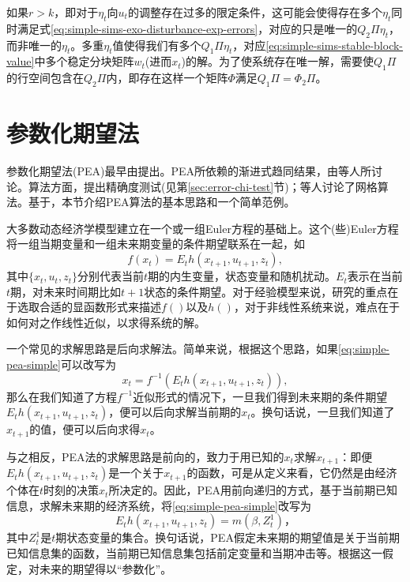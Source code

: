 如果$r>k$，即对于$\eta_t$向$u_t$的调整存在过多的限定条件，这可能会使得存在多个$\eta_t$同时满足式\eqref{eq:simple-sims-exo-disturbance-exp-errors}，对应的只是唯一的$Q_2 \Pi \eta_t$，而非唯一的$\eta_t$。多重$\eta_t$值使得我们有多个$Q_1 \Pi \eta_t$，对应\eqref{eq:simple-sims-stable-block-value}中多个稳定分块矩阵$w_t$(进而$x_t$)的解。为了使系统存在唯一解，需要使$Q_1 \Pi$的行空间包含在$Q_2 \Pi$内，即存在这样一个矩阵$\Phi$满足$Q_1 \Pi = \Phi _2 \Pi$。


\section{参数化期望法}
\label{sec:simple-pea-algorithm}

参数化期望法(PEA)最早由\cite{denHaan:1990bt}提出。PEA所依赖的渐进式趋同结果，由\cite{Marcet:1989do, Marcet:1994vw}等人所讨论。算法方面，\cite{denHaan:1994ej}提出精确度测试(见第\ref{sec:error-chi-test}节)；\cite{Christiano:2000bw}等人讨论了网格算法。基于\cite{denHaan:1990bt}，本节介绍PEA算法的基本思路和一个简单范例。

大多数动态经济学模型建立在一个或一组Euler方程的基础上。这个(些)Euler方程将一组当期变量和一组未来期变量的条件期望联系在一起，如
\begin{equation}
  \label{eq:simple-pea-simple}
  f(x_t) = E_t h(x_{t+1}, u_{t+1}, z_t),
\end{equation}
其中$\{x_t, u_t, z_t\}$分别代表当前$t$期的内生变量，状态变量和随机扰动。$E_t$表示在当前$t$期，对未来时间期比如$t+1$状态的条件期望。对于经验模型来说，研究的重点在于选取合适的显函数形式来描述$f()$以及$h()$，对于非线性系统来说，难点在于如何对之作线性近似，以求得系统的解。

一个常见的求解思路是后向求解法。简单来说，根据这个思路，如果\eqref{eq:simple-pea-simple}可以改写为
\begin{equation*}
  x_t = f^{-1} \left(E_{t} h(x_{t+1}, u_{t+1}, z_t)\right),
\end{equation*}
那么在我们知道了方程$f^{-1}$近似形式的情况下，一旦我们得到未来期的条件期望$E_{t} h(x_{t+1}, u_{t+1}, z_t)$，便可以后向求解当前期的$x_t$。换句话说，一旦我们知道了$x_{t+1}$的值，便可以后向求得$x_{t}$。

与之相反，PEA法的求解思路是前向的，致力于用已知的$x_{t}$求解$x_{t+1}$：即便$E_{t} h(x_{t+1}, u_{t+1}, z_t)$是一个关于$x_{t+1}$的函数，可是从定义来看，它仍然是由经济个体在$t$时刻的决策$x_t$所决定的。因此，PEA用前向递归的方式，基于当前期已知信息，求解未来期的经济系统，将\eqref{eq:simple-pea-simple}改写为
\begin{equation}
  \label{eq:simple-pea-basic-thinking}
  E_t h(x_{t+1}, u_{t+1}, z_t) = m(\beta, Z_{t}^{1})，
\end{equation}
其中$Z_t^1$是$t$期状态变量的集合。换句话说，PEA假定未来期的期望值是关于当前期已知信息集的函数，当前期已知信息集包括前定变量和当期冲击等。根据这一假定，对未来的期望得以``参数化''。

